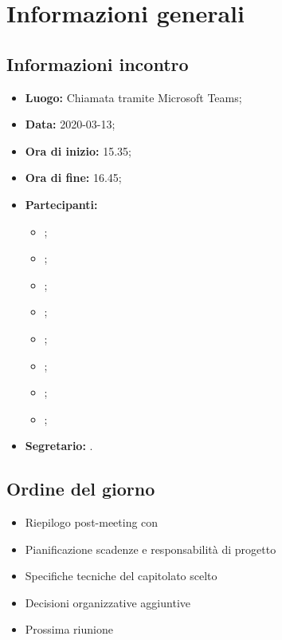 \section{Informazioni generali}
\subsection{Informazioni incontro}
\begin{itemize}
	\item \textbf{Luogo:} Chiamata tramite Microsoft Teams; 
	\item \textbf{Data:} 2020-03-13; 
	\item \textbf{Ora di inizio:} 15.35; 
	\item \textbf{Ora di fine:} 16.45; 
	\item \textbf{Partecipanti:}
		\begin{itemize}
			\item \VB; 
			\item \LB; 
			\item \NF; 
			\item \EG; 
			\item \FJ; 
			\item \MP; 
			\item \AS; 
			\item \AZ; 
		\end{itemize}
	\item \textbf{Segretario:} \AS. 
\end{itemize}

\subsection{Ordine del giorno}
\begin{itemize}
	\item Riepilogo post-meeting con \TV{}
	\item Pianificazione scadenze e responsabilità di progetto
	\item Specifiche tecniche del capitolato scelto 
	\item Decisioni organizzative aggiuntive
	\item Prossima riunione
\end{itemize}
